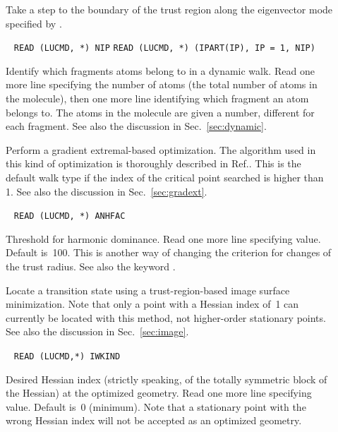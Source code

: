 \begin{description}
\item[] Take a step to the boundary of the trust
region
along the eigenvector mode specified by .

\item[]\verb| |\newline
\verb|READ (LUCMD, *) NIP|\newline
\verb|READ (LUCMD, *) (IPART(IP), IP = 1, NIP)|

Identify which fragments atoms belong to in
a dynamic walk.  Read one more line specifying the number of
atoms (the total number of atoms in the molecule), then one more
line identifying which fragment an atom belongs to. The atoms in the
molecule are given a number, different for each fragment. See also the
discussion in Sec.~\ref{sec:dynamic}.

\item[] Perform a gradient extremal-based optimization. The algorithm used in this kind of optimization is
thoroughly described in Ref.\cite{pjhjajthtca73}. This is the default walk
type if the  index of the critical point searched is higher than
1. See also the discussion in Sec.~\ref{sec:gradext}.

\item[]\verb| |\newline
\verb|READ (LUCMD, *) ANHFAC|

Threshold for harmonic dominance.  Read one
more line specifying value. Default is~100. This is  another
way of changing the criterion for changes of the trust
radius. See also the keyword .

\item[] Locate a transition state using a
trust-region-based image surface minimization.
Note that only a
point with a Hessian index of~1 can currently be located with this
method, not higher-order stationary points. See also the discussion in
Sec.~\ref{sec:image}.

\item[]\verb| |\newline
\verb|READ (LUCMD,*) IWKIND|

Desired Hessian index (strictly speaking, of the
totally symmetric block of the Hessian) at the optimized geometry.
Read one more line specifying value.  Default is~0 (minimum).
Note that a stationary point with the wrong Hessian index will not
be accepted as an optimized geometry.


\end{description}
